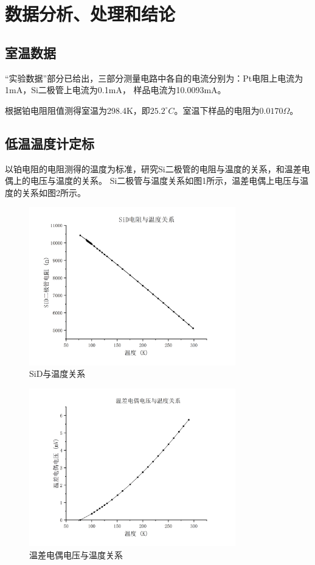 \documentclass{article}
\newcommand{\degreesCelsius}{^\circ C}
\begin{document}
    \section{数据分析、处理和结论}
    \subsection{室温数据}
    “实验数据”部分已给出，三部分测量电路中各自的电流分别为：Pt电阻上电流为1mA，Si二极管上电流为0.1mA，
    样品电流为10.0093mA。

    根据铂电阻阻值测得室温为298.4K，即$25.2\degreesCelsius$。室温下样品的电阻为$0.0170\Omega$。

    \subsection{低温温度计定标}
    以铂电阻的电阻测得的温度为标准，研究Si二极管的电阻与温度的关系，和温差电偶上的电压与温度的关系。
    Si二极管与温度关系如图1所示，温差电偶上电压与温度的关系如图2所示。

    \begin{figure}[htbp]
        \centering
        \includegraphics[width=0.8\textwidth]{SiD.jpg}
        \caption{SiD与温度关系}
    \end{figure}

    \begin{figure}[htbp]
        \centering
        \includegraphics[width=0.8\textwidth]{温差电偶.jpg}
        \caption{温差电偶电压与温度关系}
    \end{figure}
\end{document}
